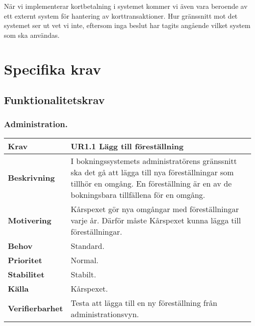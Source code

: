 \documentclass[a4paper, twoside, 11pt, titlepage]{article}
\begin{document}
	När vi implementerar kortbetalning i systemet kommer vi även vara beroende av ett externt system för hantering av korttransaktioner. Hur gränssnitt mot det systemet ser ut vet vi inte, eftersom inga beslut har tagits angående vilket system som ska användas.

\clearpage
\section{Specifika krav}



	\subsection{Funktionalitetskrav}



		\subsubsection{Administration.}


		\begin{tabular} { p{2.6cm} p{12.5cm} }
			\hline
			\sffamily\textbf{Krav} & \sffamily\textbf{UR1.1 Lägg till föreställning  } \\
			\hline
			\sffamily\textbf{Beskrivning} & I bokningssystemets administratörens gränssnitt ska det gå att lägga till nya föreställningar som tillhör en omgång. En föreställning är en av de bokningsbara tillfällena för en omgång.  \\
			\hline
			\sffamily\textbf{Motivering} & Kårspexet gör nya omgångar med föreställningar varje år. Därför måste Kårspexet kunna lägga till föreställningar.  \\
			\hline
			\sffamily\textbf{Behov} & Standard.  \\
			\hline
			\sffamily\textbf{Prioritet} & Normal.  \\
			\hline
			\sffamily\textbf{Stabilitet} & Stabilt.  \\
			\hline
			\sffamily\textbf{Källa} & Kårspexet.  \\
			\hline
			\sffamily\textbf{Verifierbarhet} & Testa att lägga till en ny föreställning från administrationsvyn.  \\
			\hline
		\end{tabular}
		\vspace{6mm}
\end{document}
